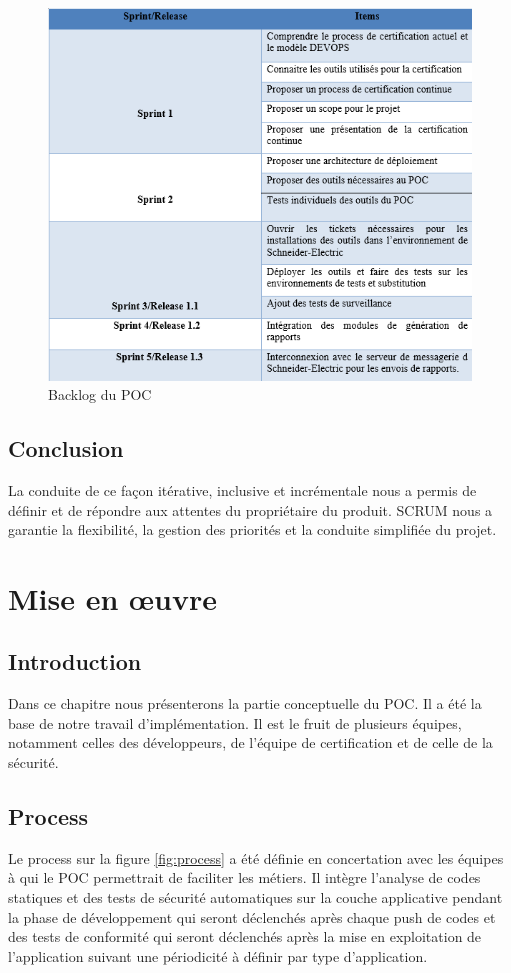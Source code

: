 \documentclass[a4paper,12pt]{book}
\theoremstyle{break}
\begin{document}
\begin{figure}[h!]
    \centering
    \includegraphics[width=1.0\textwidth]{backlog}
    \caption{Backlog du POC}
    \label{fig:backlog}
\end{figure}

\section*{Conclusion}
La conduite de ce façon itérative, inclusive et incrémentale nous a permis de définir et de répondre aux attentes du propriétaire du produit. SCRUM nous a garantie la flexibilité, la gestion des priorités et la conduite simplifiée du projet. 



\chapter{Mise en  œuvre}
\section{Introduction}
Dans ce chapitre nous présenterons la partie conceptuelle du POC. Il a été la base de notre travail d'implémentation. Il est le fruit de plusieurs équipes, notamment celles des développeurs, de l'équipe de certification et de celle de la sécurité. 

\section{Process}
Le process sur la figure \ref{fig:process} a été définie en concertation avec les équipes à qui le POC permettrait de  faciliter les métiers. 
Il intègre l'analyse de codes statiques et des tests de sécurité automatiques sur la couche applicative pendant la phase de développement qui seront déclenchés après chaque push de codes et des tests de conformité qui seront déclenchés après la mise en exploitation de l'application suivant une périodicité à définir par type d'application. 
\end{document}
